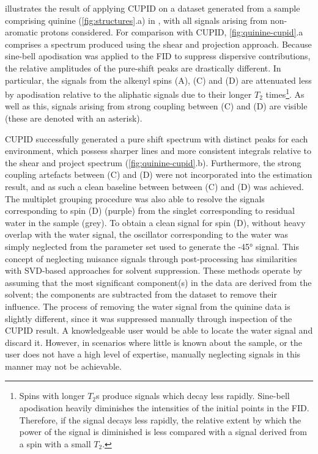  illustrates the result of applying \ac{CUPID} on
a dataset generated from a sample comprising quinine (\cref{fig:structures}.a)
in ,
with all signals arising from non-aromatic protons considered.
For comparison with \ac{CUPID}, \cref{fig:quinine-cupid}.a comprises a
spectrum produced using the shear and projection approach. Because
sine-bell apodisation was applied to the \ac{FID} to suppress dispersive
contributions, the relative amplitudes of the pure-shift
peaks are drastically different.  In particular, the signals from the alkenyl
spins (A), (C) and (D) are attenuated less by apodisation relative to the
aliphatic signals due to their longer $T_2$ times\footnote{
    Spins with longer $T_2$s produce signals which decay less rapidly.
    Sine-bell apodisation heavily diminishes the intensities of the initial
    points in the \ac{FID}. Therefore, if the signal decays less rapidly, the
    relative extent by which the power of the signal is diminished is less
    compared with a signal derived from a spin with a small $T_2$.
}. As well as this, signals arising from strong coupling between (C) and
(D) are visible (these are denoted with an asterisk).

\ac{CUPID} successfully generated a pure shift spectrum with distinct peaks for
each  environment, which possess sharper lines and more consistent
integrals relative to the shear and project spectrum (\cref{fig:quinine-cupid}.b).
Furthermore, the strong coupling artefacts between (C) and (D) were not
incorporated into the estimation result, and as such a clean baseline between
between (C) and (D) was achieved.
The multiplet grouping procedure was also able to resolve
the signals corresponding to spin (D) (purple) from the singlet corresponding
to residual water in the sample (grey).
To obtain a clean signal for spin (D), without heavy overlap with the water
signal, the oscillator corresponding to the water was simply neglected from
the parameter set used to generate the \ang{-45} signal. This concept of
neglecting nuisance signals through post-processing has similarities with
\ac{SVD}-based approaches for solvent suppression\cite{Zhu1997}.
These methods operate by assuming that the most significant component(s) in the
data are derived from the solvent; the components are subtracted from the dataset to
remove their influence. The process of removing the water signal from the quinine
data is slightly different, since it was suppressed manually through
inspection of the \ac{CUPID} result. A knowledgeable user would be able to
locate the water signal and discard it. However, in scenarios where little is
known about the sample, or the user does not have a high level of expertise,
manually neglecting signals in this manner may not be achievable.

